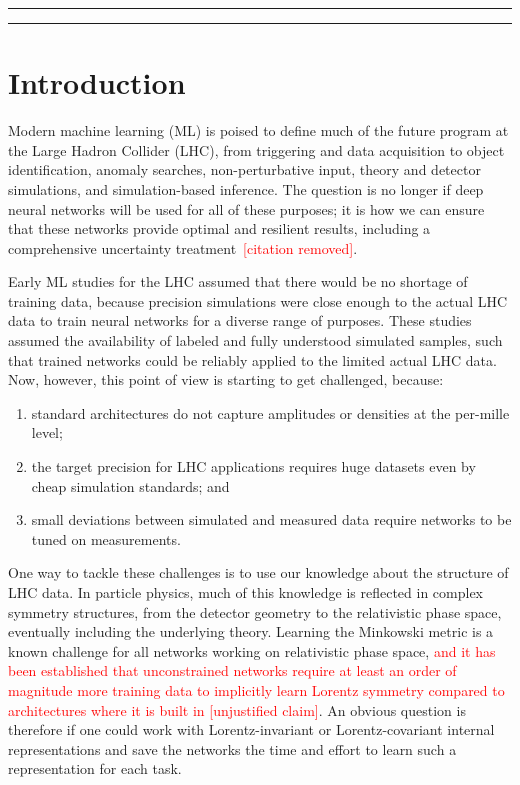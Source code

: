 \documentclass[submission, Phys]{SciPost}
\begin{document}

\vspace{10pt}
\noindent\rule{\textwidth}{1pt}
\tableofcontents\thispagestyle{fancy}
\noindent\rule{\textwidth}{1pt}
\vspace{10pt}

\newpage
\section{Introduction}
\label{sec:intro}

Modern machine learning (ML) is poised to define much of the future program at the Large Hadron Collider (LHC), from triggering and data acquisition to object identification, anomaly searches, non-perturbative input, theory and detector simulations, and simulation-based inference. The question is no longer if deep neural networks will be used for all of these purposes; it is how we can ensure that these networks provide optimal and resilient results, including a comprehensive uncertainty treatment\textcolor{red}{~[citation removed]}. 

Early ML studies for the LHC assumed that there would be no shortage of training data, because precision simulations were close enough to the actual LHC data to train neural networks for a diverse range of purposes.
%
These studies assumed the availability of labeled and fully understood simulated samples, such that trained networks could be reliably applied to the limited actual LHC data.
%
Now, however, this point of view is starting to get challenged, because:
%
\begin{enumerate}
\item standard architectures do not capture amplitudes or densities at the per-mille level; 
\item the target precision for LHC applications requires huge datasets even by cheap simulation standards; and
\item small deviations between simulated and measured data require networks to be tuned on measurements.
\end{enumerate}
%
One way to tackle these challenges is to use our knowledge about the structure of LHC data. In particle physics, much of this knowledge is reflected in complex symmetry structures, from the detector geometry to the relativistic phase space, eventually including the underlying theory. Learning the Minkowski metric is a known challenge for all networks working on relativistic phase space, \textcolor{red}{and it has been established that unconstrained networks require at least an order of magnitude more training data to implicitly learn Lorentz symmetry compared to architectures where it is built in [unjustified claim]}. An obvious question is therefore if one could work with Lorentz-invariant or Lorentz-covariant internal representations and save the networks the time and effort to learn such a representation for each task.
\end{document}
